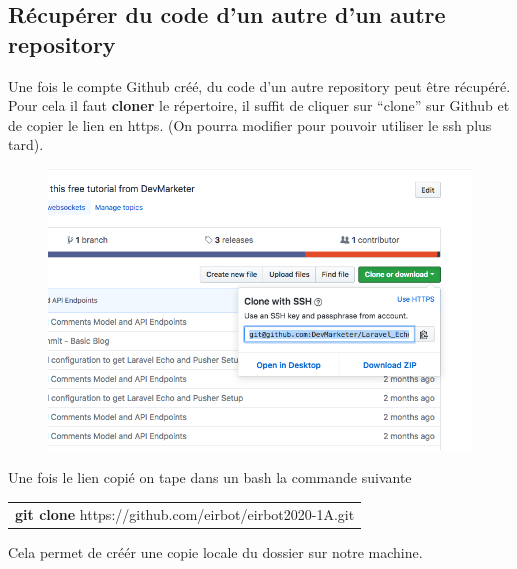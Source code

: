 \documentclass[a4paper,10pt]{article}
\begin{document}
\begin{spacing}{1.5}
\subsection*{Récupérer du code d'un autre d'un autre repository}
Une fois le compte Github créé, du code d'un autre
repository peut être récupéré. Pour cela il faut \textbf{cloner} le répertoire,
il suffit de cliquer sur ``clone'' sur Github et de copier le lien en https. (On
pourra modifier pour pouvoir utiliser le ssh plus tard).
\begin{figure}[H]
  \center
  \includegraphics[scale=0.5]{clone.png}
\end{figure}
Une fois le lien copié on tape dans un bash la commande suivante
\begin{center}
  \begin{tabular}{c}
    \rowcolor{lightgray!50!white}
      \textbf{git clone} https://github.com/eirbot/eirbot2020-1A.git
  \end{tabular}
\end{center}
Cela permet de créér une copie locale du dossier sur notre machine.


\end{spacing}
\end{document}
